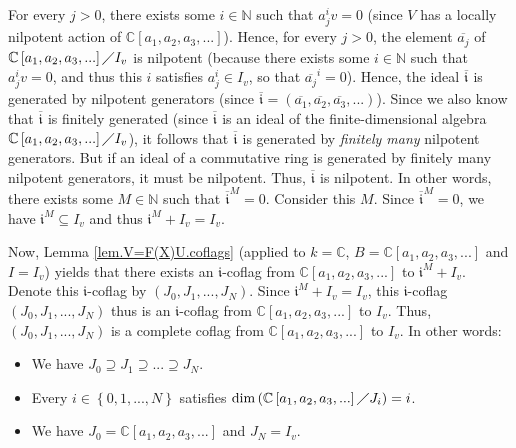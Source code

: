 \documentclass[etingof-lie.tex]{subfiles}
\begin{document}
For every $j>0$, there exists some $i\in\mathbb{N}$ such that $a_{j}^{i}v=0$
(since $V$ has a locally nilpotent action of $\mathbb{C}\left[  a_{1}%
,a_{2},a_{3},...\right]  $). Hence, for every $j>0$, the element
$\overline{a_{j}}$ of $\mathbb{C}\left[  a_{1},a_{2},a_{3},...\right]  \diagup
I_{v}$ is nilpotent (because there exists some $i\in\mathbb{N}$ such that
$a_{j}^{i}v=0$, and thus this $i$ satisfies $a_{j}^{i}\in I_{v}$, so that
$\overline{a_{j}}^{i}=0$). Hence, the ideal $\overline{\mathfrak{i}}$ is
generated by nilpotent generators (since $\overline{\mathfrak{i}}=\left(
\overline{a_{1}},\overline{a_{2}},\overline{a_{3}},...\right)  $). Since we
also know that $\overline{\mathfrak{i}}$ is finitely generated (since
$\overline{\mathfrak{i}}$ is an ideal of the finite-dimensional algebra
$\mathbb{C}\left[  a_{1},a_{2},a_{3},...\right]  \diagup I_{v}$), it follows
that $\overline{\mathfrak{i}}$ is generated by \textit{finitely many}
nilpotent generators. But if an ideal of a commutative ring is generated by
finitely many nilpotent generators, it must be nilpotent. Thus, $\overline
{\mathfrak{i}}$ is nilpotent. In other words, there exists some $M\in
\mathbb{N}$ such that $\overline{\mathfrak{i}}^{M}=0$. Consider this $M$.
Since $\overline{\mathfrak{i}}^{M}=0$, we have $\mathfrak{i}^{M}\subseteq
I_{v}$ and thus $\mathfrak{i}^{M}+I_{v}=I_{v}$.

Now, Lemma \ref{lem.V=F(X)U.coflags} (applied to $k=\mathbb{C}$,
$B=\mathbb{C}\left[  a_{1},a_{2},a_{3},...\right]  $ and $I=I_{v}$) yields
that there exists an $\mathfrak{i}$-coflag from $\mathbb{C}\left[  a_{1}%
,a_{2},a_{3},...\right]  $ to $\mathfrak{i}^{M}+I_{v}$. Denote this
$\mathfrak{i}$-coflag by $\left(  J_{0},J_{1},...,J_{N}\right)  $. Since
$\mathfrak{i}^{M}+I_{v}=I_{v}$, this $\mathfrak{i}$-coflag $\left(
J_{0},J_{1},...,J_{N}\right)  $ thus is an $\mathfrak{i}$-coflag from
$\mathbb{C}\left[  a_{1},a_{2},a_{3},...\right]  $ to $I_{v}$. Thus, $\left(
J_{0},J_{1},...,J_{N}\right)  $ is a complete coflag from $\mathbb{C}\left[
a_{1},a_{2},a_{3},...\right]  $ to $I_{v}$. In other words:

\begin{itemize}
\item We have $J_{0}\supseteq J_{1}\supseteq...\supseteq J_{N}$.

\item Every $i\in\left\{  0,1,...,N\right\}  $ satisfies $\dim\left(
\mathbb{C}\left[  a_{1},a_{2},a_{3},...\right]  \diagup J_{i}\right)  =i$.

\item We have $J_{0}=\mathbb{C}\left[  a_{1},a_{2},a_{3},...\right]  $ and
$J_{N}=I_{v}$.
\end{itemize}
\end{document}
